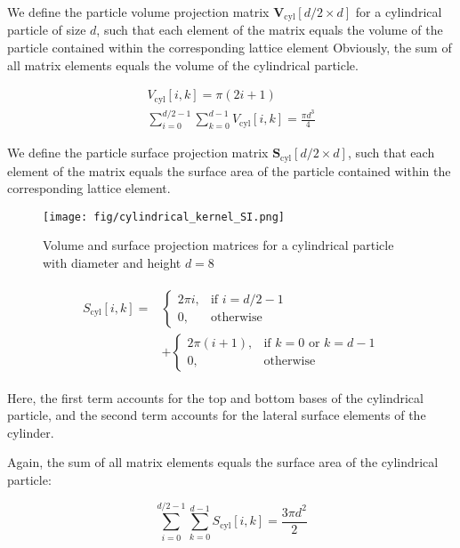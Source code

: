 \documentclass[10pt, a4paper]{article}
\begin{document}
\begin{multicols}{2}
We define the particle volume projection matrix $\mathbf{V}_{\textrm{cyl}}[d/2 \times d]$ for a cylindrical particle of size $d$, such that each element of the matrix equals the volume of the particle contained within the corresponding lattice element
Obviously, the sum of all matrix elements equals the volume of the cylindrical particle.

\begin{eqnarray}
    V_{\textrm{cyl}}[i, k] = \pi(2i + 1) \\
    \sum_{i=0}^{d/2 - 1} \sum_{k=0}^{d - 1} V_{\textrm{cyl}}[i, k] = \frac{\pi d^3}{4}
\end{eqnarray}

We define the particle surface projection matrix $\mathbf{S}_{\textrm{cyl}}[d/2 \times d]$, such that each element of the matrix equals the surface area of the particle contained within the corresponding lattice element.

\begin{figure}[H]
    \centering
    \texttt{[image: fig/cylindrical\_kernel\_SI.png]}
    \caption{Volume and surface projection matrices for a cylindrical particle with diameter and height $d = 8$}
    \label{fig:cylindrical_kernel_SI}
\end{figure}

\begin{align}
    \begin{split}
        S_{\textrm{cyl}}[i, k] = 
        &\begin{cases}
            2 \pi i,   & \text{if } i = d/2 - 1 \\
            0,         & \text{otherwise}
        \end{cases}
        \\
        &+
        \begin{cases}
            2 \pi (i + 1), & \text{if } k = 0 \text{ or } k = d - 1 \\
            0,             & \text{otherwise}
        \end{cases}
    \end{split}
\end{align}

Here, the first term accounts for the top and bottom bases of the cylindrical particle, and the second term accounts for the lateral surface elements of the cylinder.

Again, the sum of all matrix elements equals the surface area of the cylindrical particle:

\begin{equation}
    \sum_{i=0}^{d/2 - 1} \sum_{k=0}^{d - 1} S_{\textrm{cyl}}[i, k] = \frac{3 \pi d^2}{2}
\end{equation}


\end{multicols}
\end{document}
